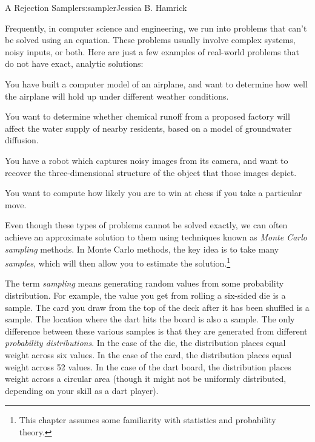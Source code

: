\begin{aosachapter}{A Rejection Sampler}{s:sampler}{Jessica B. Hamrick}

\label{introduction}

Frequently, in computer science and engineering, we run into problems
that can't be solved using an equation. These problems usually involve
complex systems, noisy inputs, or both. Here are just a few examples of
real-world problems that do not have exact, analytic solutions:

\begin{aosaenumerate}
\def\labelenumi{\arabic{enumi}.}
\item
  You have built a computer model of an airplane, and want to determine
  how well the airplane will hold up under different weather conditions.
\item
  You want to determine whether chemical runoff from a proposed factory
  will affect the water supply of nearby residents, based on a model of
  groundwater diffusion.
\item
  You have a robot which captures noisy images from its camera, and want
  to recover the three-dimensional structure of the object that those
  images depict.
\item
  You want to compute how likely you are to win at chess if you take a
  particular move.
\end{aosaenumerate}

Even though these types of problems cannot be solved exactly, we can
often achieve an approximate solution to them using techniques known as
\emph{Monte Carlo sampling} methods. In Monte Carlo methods, the key
idea is to take many \emph{samples}, which will then allow you to
estimate the solution.\footnote{This chapter assumes some familiarity
  with statistics and probability theory.}

\label{what-is-sampling}

The term \emph{sampling} means generating random values from some
probability distribution. For example, the value you get from rolling a
six-sided die is a sample. The card you draw from the top of the deck
after it has been shuffled is a sample. The location where the dart hits
the board is also a sample. The only difference between these various
samples is that they are generated from different \emph{probability
distributions}. In the case of the die, the distribution places equal
weight across six values. In the case of the card, the distribution
places equal weight across 52 values. In the case of the dart board, the
distribution places weight across a circular area (though it might not
be uniformly distributed, depending on your skill as a dart player).


\end{aosachapter}
